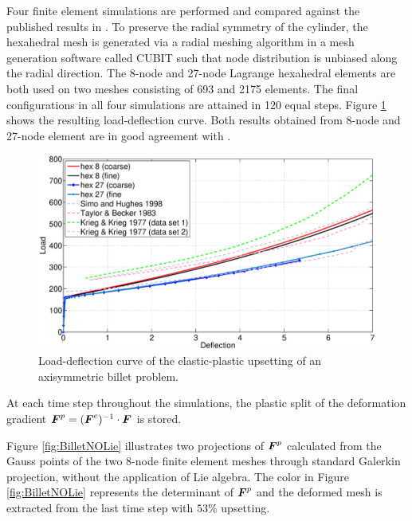 \documentclass[12pt]{article}
\begin{document}
Four finite element simulations are performed and compared against the 
published results in \citep{Krieg.Krieg:1977, Taylor.Becker:1983, Simo.Hughes:1998}. 
To preserve the radial symmetry of the cylinder, the hexahedral mesh is generated via a 
radial meshing algorithm in a mesh generation software called CUBIT such that node distribution 
is unbiased along the radial direction. The 8-node and 27-node Lagrange hexahedral elements are 
both used on two meshes consisting of 693 and 2175 elements. The final configurations in all four 
simulations are attained in 120 equal steps. Figure \ref{fig:LoadDeflection} shows the resulting 
load-deflection curve. Both results obtained from 8-node and 27-node element are  in good agreement with 
\citep{Krieg.Krieg:1977, Taylor.Becker:1983, Simo.Hughes:1998}. 
\begin{figure}[htbp]
  \begin{center}
    \unitlength=1.0mm
      \includegraphics[width=160mm]{Load_Deflection.eps}
    \caption{Load-deflection curve of the elastic-plastic upsetting of an axisymmetric billet problem. }
    \label{fig:LoadDeflection}
  \end{center}
\end{figure}

At each time step throughout the simulations, the plastic split of the deformation gradient ${\boldsymbol{F}}^{p} =
({\boldsymbol{F}}^{e})^{-1} \cdot {\boldsymbol{F}}$ is stored. 

Figure \ref{fig:BilletNOLie}
illustrates two projections of ${\boldsymbol{F}}^{p}$ calculated from the Gauss
points of the two 8-node finite element meshes through standard 
Galerkin projection, without the application of Lie algebra. The color in Figure 
\ref{fig:BilletNOLie} represents the  determinant of ${\boldsymbol{F}}^{p}$  and the deformed 
mesh is extracted from the last time step with $53\%$ upsetting. 
\end{document}
